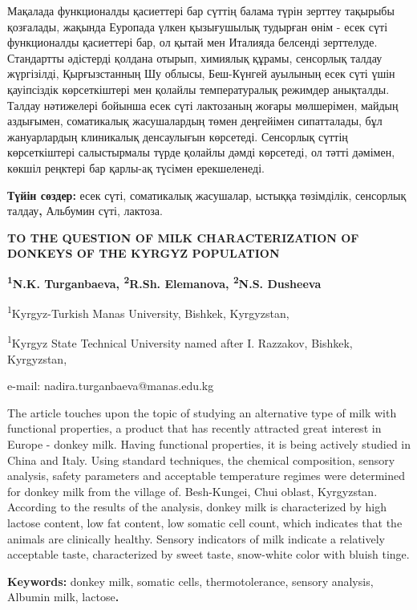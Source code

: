 Мақалада функционалды қасиеттері бар сүттің балама түрін зерттеу
тақырыбы қозғалады, жақында Еуропада үлкен қызығушылық тудырған өнім -
есек сүті функционалды қасиеттері бар, ол қытай мен Италияда белсенді
зерттелуде. Стандартты әдістерді қолдана отырып, химиялық құрамы,
сенсорлық талдау жүргізілді, Қырғызстанның Шу облысы, Беш-Күнгей
ауылының есек сүті үшін қауіпсіздік көрсеткіштері мен қолайлы
температуралық режимдер анықталды. Талдау нәтижелері бойынша есек сүті
лактозаның жоғары мөлшерімен, майдың аздығымен, соматикалық жасушалардың
төмен деңгейімен сипатталады, бұл жануарлардың клиникалық денсаулығын
көрсетеді. Сенсорлық сүттің көрсеткіштері салыстырмалы түрде қолайлы
дәмді көрсетеді, ол тәтті дәмімен, көкшіл реңктері бар қарлы-ақ түсімен
ерекшеленеді.

{\bfseries Түйін сөздер:} есек сүті, соматикалық жасушалар, ыстыққа
төзімділік, сенсорлық талдау{\bfseries ,} Альбумин сүті, лактоза.

\begin{center}
{\large\bfseries TO THE QUESTION OF MILK CHARACTERIZATION OF DONKEYS OF THE
KYRGYZ POPULATION}

{\bfseries \textsuperscript{1}N.K. Turganbaeva\envelope, \textsuperscript{2}R.Sh.
Elemanova, \textsuperscript{2}N.S. Dusheeva}

\textsuperscript{1}Kyrgyz-Turkish Manas University, Bishkek, Kyrgyzstan,

\textsuperscript{1}Kyrgyz State Technical University named after I.
Razzakov, Bishkek, Kyrgyzstan,

e-mail: nadira.turganbaeva@manas.edu.kg
\end{center}

The article touches upon the topic of studying an alternative type of
milk with functional properties, a product that has recently attracted
great interest in Europe - donkey milk. Having functional properties, it
is being actively studied in China and Italy. Using standard techniques,
the chemical composition, sensory analysis, safety parameters and
acceptable temperature regimes were determined for donkey milk from the
village of. Besh-Kungei, Chui oblast, Kyrgyzstan. According to the
results of the analysis, donkey milk is characterized by high lactose
content, low fat content, low somatic cell count, which indicates that
the animals are clinically healthy. Sensory indicators of milk indicate
a relatively acceptable taste, characterized by sweet taste, snow-white
color with bluish tinge.

{\bfseries Keywords:} donkey milk, somatic cells, thermotolerance, sensory
analysis, Albumin milk, lactose{\bfseries .}

